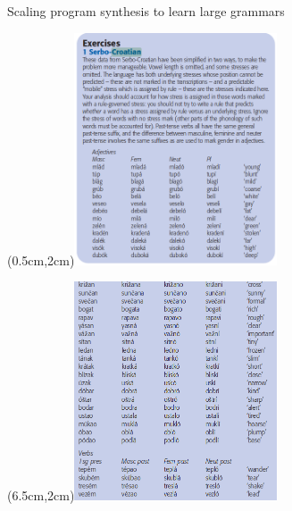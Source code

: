 \documentclass{beamer}
\begin{document}
  












\begin{frame}{Scaling program synthesis to learn large grammars}
  
  \begin{textblock*}{10cm}(0.5cm,2cm)\includegraphics[width=6cm]{Croatian1.png}\end{textblock*}
  \begin{textblock*}{10cm}(6.5cm,2cm)\includegraphics[width=6cm]{Croatian2.png}\end{textblock*}

\end{frame}
\end{document}
